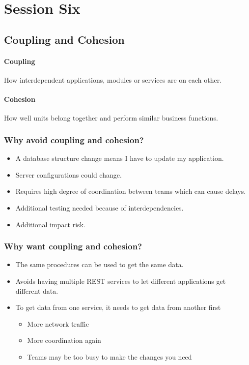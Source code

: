 \section{Session Six}\label{sec:fpse_session_six}

\subsection{Coupling and Cohesion}\label{sub:coupling_and_cohesion}

\paragraph{Coupling}\label{par:coupling}

How interdependent applications, modules or services are on each other.

\paragraph{Cohesion}\label{par:cohesion}

How well units belong together and perform similar business functions.

\subsubsection{Why avoid coupling and cohesion?}\label{ssub:why_avoid_coupling_and_cohesion_}

\begin{itemize}

	\item A database structure change means I have to update my application.
	\item Server configurations could change.
	\item Requires high degree of coordination between teams which can cause delays.
	\item Additional testing needed because of interdependencies.
	\item Additional impact risk.
\end{itemize}

\subsubsection{Why want coupling and cohesion?}\label{ssub:why_want_coupling_and_cohesion_}

\begin{itemize}
	\item The same procedures can be used to get the same data.
	\item Avoids having multiple REST services to let different applications get different data.
	\item To get data from one service, it needs to get data from another first
	      \begin{itemize}
		      \item More network traffic
		      \item More coordination again
		      \item Teams may be too busy to make the changes you need
	      \end{itemize}
\end{itemize}

